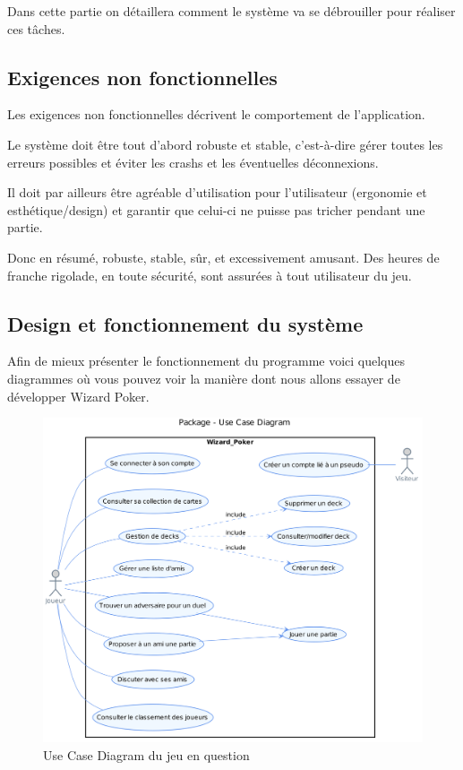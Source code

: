 \documentclass[11pt,a4paper]{article}
\begin{document}
Dans cette partie on détaillera comment le système va se débrouiller
pour réaliser ces tâches.


\subsection{Exigences non fonctionnelles}
\label{sec:exi-nonfonc-sys}

Les exigences non fonctionnelles décrivent le comportement de
l'application.

Le système doit être tout d'abord robuste et stable, c'est-à-dire
gérer toutes les erreurs possibles et éviter les crashs et les éventuelles
déconnexions.

Il doit par ailleurs être agréable d'utilisation pour l'utilisateur
(ergonomie et esthétique/design) et garantir que celui-ci ne puisse
pas tricher pendant une partie.

Donc en résumé, robuste, stable, sûr, et excessivement amusant. Des
heures de franche rigolade, en toute sécurité, sont assurées à tout
utilisateur du jeu.

\subsection{Design et fonctionnement du système}
\label{sec:design}

Afin de mieux présenter le fonctionnement du programme voici quelques
diagrammes où vous pouvez voir la manière dont nous allons essayer de
développer Wizard Poker.

\begin{figure}
  \centering
  \includegraphics[width=1\textwidth]{../uml_files/UseCaseDiagram.png}
  \caption{\label{fig:usecase} Use Case Diagram du jeu en question}
\end{figure}
\end{document}

